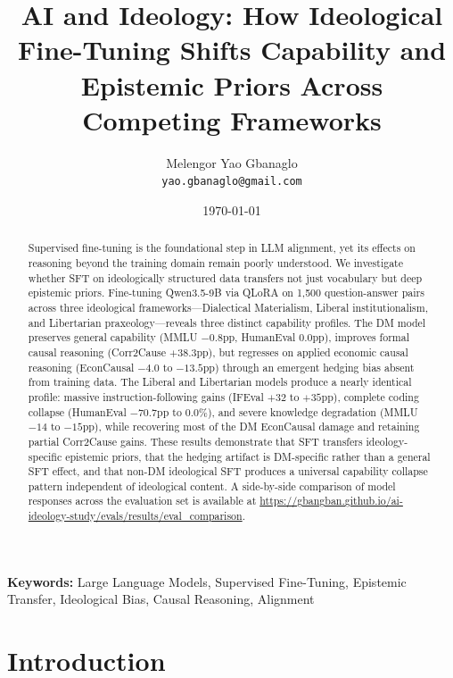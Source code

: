\documentclass[11pt]{article}
\begin{document}
\title{AI and Ideology: How Ideological Fine-Tuning Shifts Capability and Epistemic Priors Across Competing Frameworks}

\author{Melengor Yao Gbanaglo \\
\texttt{yao.gbanaglo@gmail.com}}
\date{\today}

\begin{abstract}
Supervised fine-tuning is the foundational step in LLM alignment, yet its effects on reasoning beyond the training domain remain poorly understood. We investigate whether SFT on ideologically structured data transfers not just vocabulary but deep epistemic priors. Fine-tuning Qwen3.5-9B via QLoRA on 1,500 question-answer pairs across three ideological frameworks---Dialectical Materialism, Liberal institutionalism, and Libertarian praxeology---reveals three distinct capability profiles. The DM model preserves general capability (MMLU $-0.8$pp, HumanEval $0.0$pp), improves formal causal reasoning (Corr2Cause $+38.3$pp), but regresses on applied economic causal reasoning (EconCausal $-4.0$ to $-13.5$pp) through an emergent hedging bias absent from training data. The Liberal and Libertarian models produce a nearly identical profile: massive instruction-following gains (IFEval $+32$ to $+35$pp), complete coding collapse (HumanEval $-70.7$pp to $0.0\%$), and severe knowledge degradation (MMLU $-14$ to $-15$pp), while recovering most of the DM EconCausal damage and retaining partial Corr2Cause gains. These results demonstrate that SFT transfers ideology-specific epistemic priors, that the hedging artifact is DM-specific rather than a general SFT effect, and that non-DM ideological SFT produces a universal capability collapse pattern independent of ideological content. A side-by-side comparison of model responses across the evaluation set is available at \url{https://gbangban.github.io/ai-ideology-study/evals/results/eval_comparison}.
\end{abstract}

\maketitle

\noindent\textbf{Keywords:} Large Language Models, Supervised Fine-Tuning, Epistemic Transfer, Ideological Bias, Causal Reasoning, Alignment

\section{Introduction}
\end{document}
